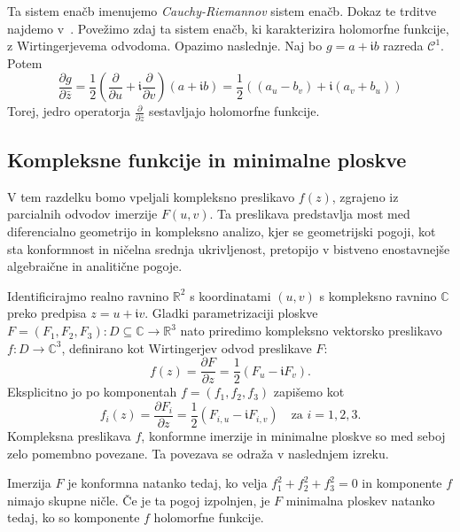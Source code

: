 \documentclass[fin1, tisk, bibtex]{fmfdelo}
\begin{document}
Ta sistem enačb imenujemo \emph{Cauchy-Riemannov} sistem enačb. Dokaz te trditve najdemo v~\cite[str.~223]{ana2}. Povežimo zdaj ta sistem enačb, ki karakterizira holomorfne funkcije, z Wirtingerjevema odvodoma. Opazimo naslednje. Naj bo $g=a+\mathfrak{i} b$ razreda $\mathcal{C}^1$. Potem
\begin{equation*}
    \frac{\partial g}{\partial \bar{z}}=\frac{1}{2}\left(\frac{\partial}{\partial u}+\mathfrak{i} \frac{\partial}{\partial v}\right)(a+\mathfrak{i} b)=\frac{1}{2}\left(\left(a_u-b_v\right)+\mathfrak{i}\left(a_v+b_u\right)\right)
\end{equation*}
Torej, jedro operatorja $\frac{\partial}{\partial \bar{z}}$ sestavljajo holomorfne funkcije.


\subsection{Kompleksne funkcije in minimalne ploskve}

V tem razdelku bomo vpeljali kompleksno preslikavo $f(z)$, zgrajeno iz parcialnih odvodov imerzije $F(u,v)$. Ta preslikava predstavlja most med diferencialno geometrijo in kompleksno analizo, kjer se geometrijski pogoji, kot sta konformnost in ničelna srednja ukrivljenost, pretopijo v bistveno enostavnejše algebraične in analitične pogoje.

Identificirajmo realno ravnino $\mathbb{R}^2$ s koordinatami $(u,v)$ s kompleksno ravnino $\mathbb{C}$ preko predpisa $z = u + \mathfrak{i}v$. Gladki parametrizaciji ploskve $F = (F_1, F_2, F_3): D \subseteq \mathbb{C} \rightarrow \mathbb{R}^3$ nato priredimo kompleksno vektorsko preslikavo $f: D \rightarrow \mathbb{C}^3$, definirano kot Wirtingerjev odvod preslikave $F$:
\begin{equation*}
    f(z) = \frac{\partial F}{\partial z} = \frac{1}{2}\left(F_u - \mathfrak{i} F_v\right).
\end{equation*}
Eksplicitno jo po komponentah $f = (f_1, f_2, f_3)$ zapišemo kot
\begin{equation}
    f_i(z) = \frac{\partial F_i}{\partial z} = \frac{1}{2}\left(F_{i,u} - \mathfrak{i} F_{i,v}\right) \quad \text{za } i = 1, 2, 3. \label{eq:fkomponente}
\end{equation}
Kompleksna preslikava $f$, konformne imerzije in minimalne ploskve so med seboj zelo pomembno povezane. Ta povezava se odraža v naslednjem izreku.

\begin{trditev}\label{thm:weierstrass_prvi}
    Imerzija $F$ je konformna natanko tedaj, ko velja $f_1^2 + f_2^2+ f_3^2=0$ in komponente $f$ nimajo skupne ničle. Če je ta pogoj izpolnjen, je $F$ minimalna ploskev natanko tedaj, ko so komponente $f$ holomorfne funkcije.
\end{trditev}
\end{document}
